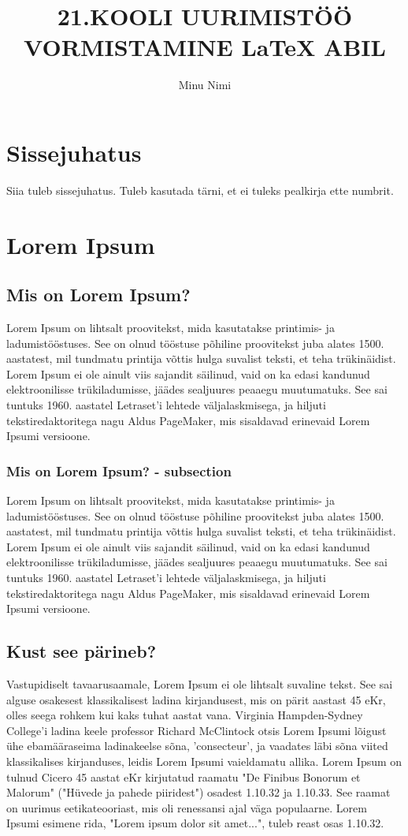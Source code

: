\documentclass{21kuur}
\title{21.KOOLI UURIMISTÖÖ VORMISTAMINE LaTeX ABIL}
\author{Minu Nimi}
\begin{document}
\maketitle
\tableofcontents

\chapter*{Sissejuhatus}
Siia tuleb sissejuhatus. Tuleb kasutada tärni, et ei tuleks pealkirja ette numbrit. 


\chapter{Lorem Ipsum}

\section{Mis on Lorem Ipsum?}
Lorem Ipsum on lihtsalt proovitekst, mida kasutatakse printimis- ja ladumistööstuses. See on olnud tööstuse põhiline proovitekst juba alates 1500. aastatest, mil tundmatu printija võttis hulga suvalist teksti, et teha trükinäidist. Lorem Ipsum ei ole ainult viis sajandit säilinud, vaid on ka edasi kandunud elektroonilisse trükiladumisse, jäädes sealjuures peaaegu muutumatuks. See sai tuntuks 1960. aastatel Letraset'i lehtede väljalaskmisega, ja hiljuti tekstiredaktoritega nagu Aldus PageMaker, mis sisaldavad erinevaid Lorem Ipsumi versioone.

\subsection{Mis on Lorem Ipsum? - subsection}
Lorem Ipsum on lihtsalt proovitekst, mida kasutatakse printimis- ja ladumistööstuses. See on olnud tööstuse põhiline proovitekst juba alates 1500. aastatest, mil tundmatu printija võttis hulga suvalist teksti, et teha trükinäidist. Lorem Ipsum ei ole ainult viis sajandit säilinud, vaid on ka edasi kandunud elektroonilisse trükiladumisse, jäädes sealjuures peaaegu muutumatuks. See sai tuntuks 1960. aastatel Letraset'i lehtede väljalaskmisega, ja hiljuti tekstiredaktoritega nagu Aldus PageMaker, mis sisaldavad erinevaid Lorem Ipsumi versioone.

\section{Kust see pärineb?}
Vastupidiselt tavaarusaamale, Lorem Ipsum ei ole lihtsalt suvaline tekst. See sai alguse osakesest klassikalisest ladina kirjandusest, mis on pärit aastast 45 eKr, olles seega rohkem kui kaks tuhat aastat vana. Virginia Hampden-Sydney College'i ladina keele professor Richard McClintock otsis Lorem Ipsumi lõigust ühe ebamääraseima ladinakeelse sõna, 'consecteur', ja vaadates läbi sõna viited klassikalises kirjanduses, leidis Lorem Ipsumi vaieldamatu allika. Lorem Ipsum on tulnud Cicero 45 aastat eKr kirjutatud raamatu "De Finibus Bonorum et Malorum" ("Hüvede ja pahede piiridest") osadest 1.10.32 ja 1.10.33. See raamat on uurimus eetikateooriast, mis oli renessansi ajal väga populaarne. Lorem Ipsumi esimene rida, "Lorem ipsum dolor sit amet...", tuleb reast osas 1.10.32.
\end{document}
